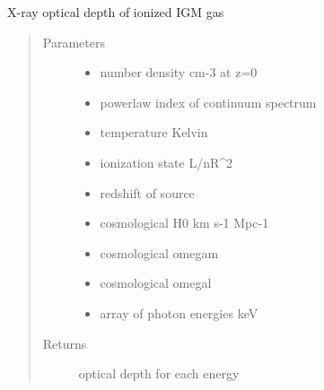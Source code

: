 \documentclass[letterpaper,10pt,english]{sphinxmanual}
\begin{document}
\begin{fulllineitems}
\label{\detokenize{astro_functions:astro.iigmtau}}
X-ray optical depth of ionized IGM gas
\begin{quote}\begin{description}
\item[{Parameters}] \leavevmode\begin{itemize}
\item {} 
 \textendash{} number density cm-3 at z=0

\item {} 
 \textendash{} powerlaw index of continuum spectrum

\item {} 
 \textendash{} temperature Kelvin

\item {} 
 \textendash{} ionization state L/nR\textasciicircum{}2

\item {} 
 \textendash{} redshift of source

\item {} 
 \textendash{} cosmological H0 km s-1 Mpc-1

\item {} 
 \textendash{} cosmological omegam

\item {} 
 \textendash{} cosmological omegal

\item {} 
 \textendash{} array of photon energies keV

\end{itemize}

\item[{Returns}] \leavevmode
optical depth for each energy

\end{description}\end{quote}

\end{fulllineitems}
\end{document}
